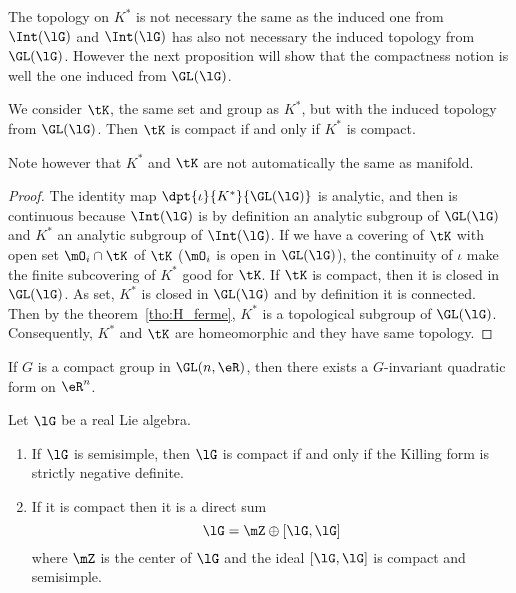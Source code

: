 \begin{remark}
The topology on $K^*$ is not necessary the same as the induced one from $\Int(\lG)$ and $\Int(\lG)$ has also not necessary the induced topology from $\GL(\lG)$. However the next proposition will show that the compactness notion is well the one induced from $\GL(\lG)$.
\end{remark}

\begin{proposition}
We consider $\tK$, the same set and group as $K^*$, but with the induced topology from $\GL(\lG)$. Then $\tK$ is compact if and only if $K^*$ is compact.
\end{proposition}

Note however that $K^*$ and $\tK$ are not automatically the same as manifold.

\begin{proof}
The identity map $\dpt{\iota}{K^*}{\GL(\lG)}$ is analytic, and then is continuous because $\Int(\lG)$ is by definition an analytic subgroup of $\GL(\lG)$ and $K^*$ an analytic subgroup of $\Int(\lG)$. If we have a covering of $\tK$ with open set $\mO_i\cap\tK$ of $\tK$ ($\mO_i$ is open in $\GL(\lG)$), the continuity of $\iota$ make the finite subcovering of $K^*$ good for $\tK$.
If $\tK$ is compact, then it is closed in $\GL(\lG)$. As set, $K^*$ is closed in $\GL(\lG)$ and by definition it is connected. Then by the theorem~\ref{tho:H_ferme}, $K^*$ is a topological subgroup of $\GL(\lG)$. Consequently, $K^*$ and $\tK$ are homeomorphic and they have same topology.
\end{proof}

\begin{lemma}
    If $G$ is a compact group in $\GL(n,\eR)$, then there exists a $G$-invariant quadratic form on $\eR^n$.
\end{lemma}

\begin{proposition}     \label{ProplGcompactKillNeg}
Let $\lG$ be a real Lie algebra.

\begin{enumerate}
\item If $\lG$ is semisimple, then $\lG$ is compact if and only if  the Killing form is strictly negative definite.
\item If it is compact then it is a direct sum
\begin{equation}
   \lG=\mZ\oplus [\lG,\lG]
\end{equation}
where $\mZ$ is the center of $\lG$ and the ideal $[\lG,\lG]$ is compact and semisimple.
\end{enumerate}
\label{prop:compact_Killing}
\end{proposition}

